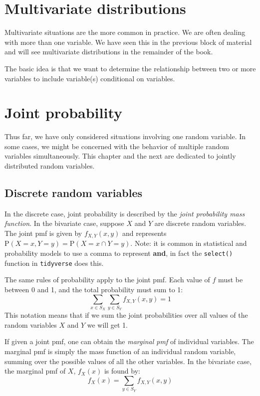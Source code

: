\documentclass[
  letterpaper,
  DIV=11,
  numbers=noendperiod]{scrreprt}
\begin{document}
\section{Multivariate distributions}\label{multivariate-distributions-1}

Multivariate situations are the more common in practice. We are often
dealing with more than one variable. We have seen this in the previous
block of material and will see multivariate distributions in the
remainder of the book.

The basic idea is that we want to determine the relationship between two
or more variables to include variable(s) conditional on variables.

\section{Joint probability}\label{joint-probability}

Thus far, we have only considered situations involving one random
variable. In some cases, we might be concerned with the behavior of
multiple random variables simultaneously. This chapter and the next are
dedicated to jointly distributed random variables.

\subsection{Discrete random variables}\label{discrete-random-variables}

In the discrete case, joint probability is described by the \emph{joint
probability mass function}. In the bivariate case, suppose \(X\) and
\(Y\) are discrete random variables. The joint pmf is given by
\(f_{X,Y}(x,y)\) and represents
\(\mbox{P}(X=x,Y=y) = \mbox{P}(X=x \cap Y=y)\). Note: it is common in
statistical and probability models to use a comma to represent
\textbf{and}, in fact the \texttt{select()} function in
\texttt{tidyverse} does this.

The same rules of probability apply to the joint pmf. Each value of
\(f\) must be between 0 and 1, and the total probability must sum to 1:
\[
\sum_{x\in S_X}\sum_{y \in S_Y} f_{X,Y}(x,y) = 1
\] This notation means that if we sum the joint probabilities over all
values of the random variables \(X\) and \(Y\) we will get 1.

If given a joint pmf, one can obtain the \emph{marginal pmf} of
individual variables. The marginal pmf is simply the mass function of an
individual random variable, summing over the possible values of all the
other variables. In the bivariate case, the marginal pmf of \(X\),
\(f_X(x)\) is found by: \[
f_X(x)=\sum_{y \in S_Y}f_{X,Y}(x,y)
\]
\end{document}

